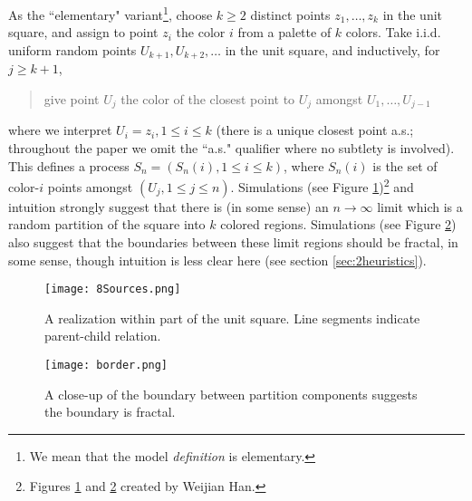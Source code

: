 \documentclass[12pt]{article}
\begin{document}
As the ``elementary" variant\footnote{We mean that the model {\em definition} is elementary.}, 
choose $k \ge 2$ distinct points $z_1, \ldots, z_k$ in the unit square, and assign to point $z_i$ the color $i$ from a palette of $k$ colors.  
Take i.i.d. uniform random points $U_{k+1}, U_{k+2}, \ldots$ in the unit square, 
and inductively, for $j \ge k+1$,
\begin{quote}
give point $U_j$  the color of the closest point to $U_j$ 
amongst $U_1,\ldots,U_{j-1}$
\end{quote}
where we interpret $U_i = z_i, 1 \le i \le k$   
(there is a unique closest point a.s.; throughout the paper we omit the ``a.s." qualifier where no subtlety is involved).
This defines a process 
$S_n = (S_n(i), 1 \le i \le k)$, where $S_n(i)$ is the set of color-$i$ 
points amongst $(U_j, 1 \le j \le n)$.  
Simulations (see Figure \ref{fig_1})\footnote{Figures  \ref{fig_1} and  \ref{fig_2} created by  Weijian Han.} 
and intuition strongly suggest that there is (in some sense) an $n \to \infty$ limit which
is a random partition of the square into $k$ colored regions. 
Simulations (see Figure \ref{fig_2}) also suggest that the boundaries between these limit regions should be fractal, in some sense, though 
intuition is less clear here (see section \ref{sec:2heuristics}). 


\begin{figure}
\caption{A realization within part of the unit square.  
Line segments indicate parent-child relation.}
\label{fig_1}
\begin{center}
 \texttt{[image: 8Sources.png]}
 \end{center}

\end{figure}

\begin{figure}
\caption{A close-up of the boundary between partition components suggests the boundary is fractal.}
\label{fig_2}
\begin{center}
 \texttt{[image: border.png]}
 \end{center}

\end{figure}
\end{document}
